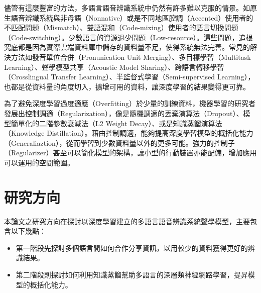 儘管有這麼豐富的方法，多語言語音辨識系統中仍然有許多難以克服的情景。如原生語音辨識系統與非母語（Nonnative）或是不同地區腔調（Accented）使用者的不匹配問題（Mismatch）、雙語混和（Code-mixing）使用者的語言切換問題（Code-switching）。少數語言的資源過少問題（Low-resource）。這些問題，追根究底都是因為實際雲端資料庫中儲存的資料量不足，使得系統無法完善。常見的解決方法如發音單位合併（Pronunication Unit Merging）、多目標學習（Multitask Learning）、聲學模型共享（Acoustic Model Sharing）、跨語言轉移學習（Crosslingual Transfer Learning）、半監督式學習（Semi-supervised Learning），也都是從資料量的角度切入，擴增可用的資料，讓深度學習的結果變得更可靠。

為了避免深度學習過度適應（Overfitting）於少量的訓練資料，機器學習的研究者發展出控制調適（Regularization），像是隨機調適的丟棄演算法（Dropout）、模型簡單化的二階參數衰減法（L2 Weight Decay）、或是知識蒸餾演算法（Knowledge Distillation）。藉由控制調適，能夠提高深度學習模型的概括化能力（Generaliaztion），從而學習到少數資料量以外的更多可能。強力的控制子（Regularizer）甚至可以簡化模型的架構，讓小型的行動裝置亦能配備，增加應用可以運用的空間範圍。

\section{研究方向}
本論文之研究方向在探討以深度學習建立的多語言語音辨識系統聲學模型，主要包含以下幾點：

\begin{itemize}
\itemsep -2pt %
  \item  第一階段先探討多個語言間如何合作分享資訊，以用較少的資料獲得更好的辨識結果。

  \item  第二階段則探討如何利用知識蒸餾幫助多語言的深層類神經網路學習，提昇模型的概括化能力。

\end{itemize}
